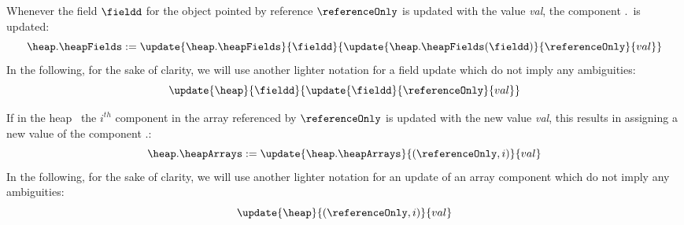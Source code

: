  
   Whenever the  field $\fieldd$ for the object pointed by reference
 $\referenceOnly$ is updated  with the value \textit{val},
 the component \heap.\heapFields \ is updated:
 $$ \heap.\heapFields := \update{\heap.\heapFields}{\fieldd}{\update{\heap.\heapFields(\fieldd)}{\referenceOnly}{val}} $$  
 In the following, for the sake of clarity, we will use another lighter notation for a field update which do not imply any ambiguities:
 $$ 
  \update{\heap}{\fieldd}{\update{\fieldd}{\referenceOnly}{val}} 
 $$ 



 If in the heap \heap \ 
 the $i^{th}$ component in the array referenced by $\referenceOnly$ is updated with the new value \textit{val},
 this results in assigning a new value of the component \heap.\heapArrays:
 $$\heap.\heapArrays := \update{\heap.\heapArrays}{(\referenceOnly , i)}{val} $$ 
 In the following, for the sake of clarity, we will use another lighter notation for an update of an array component
 which do not imply any ambiguities:
 $$ 
  \update{\heap}{(\referenceOnly , i) }{val} 
 $$ 

 
 

